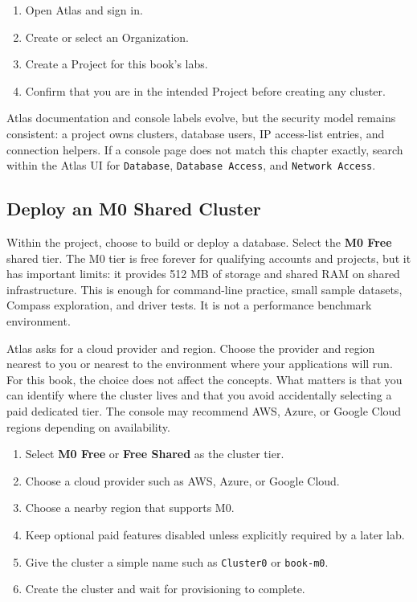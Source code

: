 \begin{enumerate}
    \item Open Atlas and sign in.
    \item Create or select an Organization.
    \item Create a Project for this book's labs.
    \item Confirm that you are in the intended Project before creating any cluster.
\end{enumerate}

\begin{notebox}
Atlas documentation and console labels evolve, but the security model remains consistent: a project owns clusters, database users, IP access-list entries, and connection helpers. If a console page does not match this chapter exactly, search within the Atlas UI for \texttt{Database}, \texttt{Database Access}, and \texttt{Network Access}.
\end{notebox}

\subsection{Deploy an M0 Shared Cluster}
Within the project, choose to build or deploy a database. Select the \textbf{M0 Free} shared tier. The M0 tier is free forever for qualifying accounts and projects, but it has important limits: it provides 512 MB of storage and shared RAM on shared infrastructure. This is enough for command-line practice, small sample datasets, Compass exploration, and driver tests. It is not a performance benchmark environment.

Atlas asks for a cloud provider and region. Choose the provider and region nearest to you or nearest to the environment where your applications will run. For this book, the choice does not affect the concepts. What matters is that you can identify where the cluster lives and that you avoid accidentally selecting a paid dedicated tier. The console may recommend AWS, Azure, or Google Cloud regions depending on availability.

\begin{enumerate}
    \item Select \textbf{M0 Free} or \textbf{Free Shared} as the cluster tier.
    \item Choose a cloud provider such as AWS, Azure, or Google Cloud.
    \item Choose a nearby region that supports M0.
    \item Keep optional paid features disabled unless explicitly required by a later lab.
    \item Give the cluster a simple name such as \texttt{Cluster0} or \texttt{book-m0}.
    \item Create the cluster and wait for provisioning to complete.
\end{enumerate}

